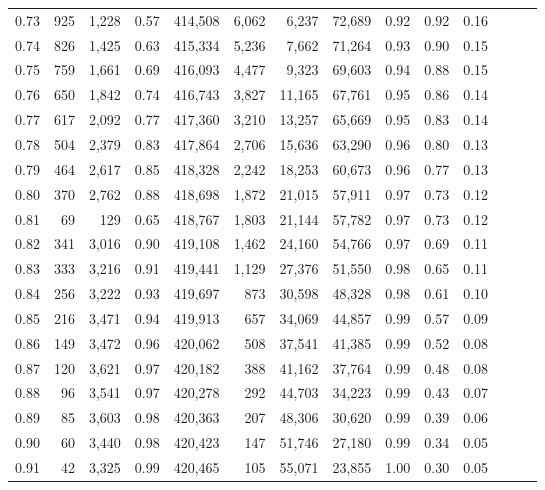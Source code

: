 \begin{tabular}{rrrrrrrrrrrrrr}
0.73 &    925 &  1,228 &  0.57 &  414,508 &    6,062 &   6,237 &  72,689 &  0.92 &  0.92 &      0.16 \\
0.74 &    826 &  1,425 &  0.63 &  415,334 &    5,236 &   7,662 &  71,264 &  0.93 &  0.90 &      0.15 \\
0.75 &    759 &  1,661 &  0.69 &  416,093 &    4,477 &   9,323 &  69,603 &  0.94 &  0.88 &      0.15 \\
0.76 &    650 &  1,842 &  0.74 &  416,743 &    3,827 &  11,165 &  67,761 &  0.95 &  0.86 &      0.14 \\
0.77 &    617 &  2,092 &  0.77 &  417,360 &    3,210 &  13,257 &  65,669 &  0.95 &  0.83 &      0.14 \\
0.78 &    504 &  2,379 &  0.83 &  417,864 &    2,706 &  15,636 &  63,290 &  0.96 &  0.80 &      0.13 \\
0.79 &    464 &  2,617 &  0.85 &  418,328 &    2,242 &  18,253 &  60,673 &  0.96 &  0.77 &      0.13 \\
0.80 &    370 &  2,762 &  0.88 &  418,698 &    1,872 &  21,015 &  57,911 &  0.97 &  0.73 &      0.12 \\
0.81 &     69 &    129 &  0.65 &  418,767 &    1,803 &  21,144 &  57,782 &  0.97 &  0.73 &      0.12 \\
0.82 &    341 &  3,016 &  0.90 &  419,108 &    1,462 &  24,160 &  54,766 &  0.97 &  0.69 &      0.11 \\
0.83 &    333 &  3,216 &  0.91 &  419,441 &    1,129 &  27,376 &  51,550 &  0.98 &  0.65 &      0.11 \\
0.84 &    256 &  3,222 &  0.93 &  419,697 &      873 &  30,598 &  48,328 &  0.98 &  0.61 &      0.10 \\
0.85 &    216 &  3,471 &  0.94 &  419,913 &      657 &  34,069 &  44,857 &  0.99 &  0.57 &      0.09 \\
0.86 &    149 &  3,472 &  0.96 &  420,062 &      508 &  37,541 &  41,385 &  0.99 &  0.52 &      0.08 \\
0.87 &    120 &  3,621 &  0.97 &  420,182 &      388 &  41,162 &  37,764 &  0.99 &  0.48 &      0.08 \\
0.88 &     96 &  3,541 &  0.97 &  420,278 &      292 &  44,703 &  34,223 &  0.99 &  0.43 &      0.07 \\
0.89 &     85 &  3,603 &  0.98 &  420,363 &      207 &  48,306 &  30,620 &  0.99 &  0.39 &      0.06 \\
0.90 &     60 &  3,440 &  0.98 &  420,423 &      147 &  51,746 &  27,180 &  0.99 &  0.34 &      0.05 \\
0.91 &     42 &  3,325 &  0.99 &  420,465 &      105 &  55,071 &  23,855 &  1.00 &  0.30 &      0.05 \\

\end{tabular}
